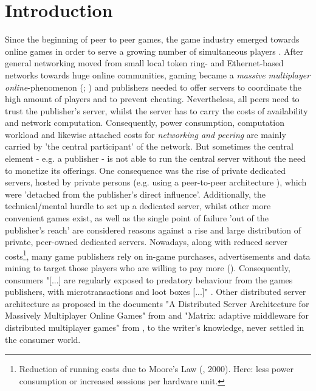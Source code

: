 
\chapter{Introduction}
\label{chap:Introduction}

Since the beginning of peer to peer games, the game industry emerged towards online games in order to serve a growing number of simultaneous players \cite[192]{Nagygyorgy.2013}.
After general networking moved from small local token ring- and Ethernet-based networks \cite[1]{Smythe.1999}
towards huge online communities, gaming became a \textit{massive multiplayer online}-phenomenon (\citet[1]{Williams.2008}; \citet[1]{Wang.2012})
and publishers needed to offer servers to coordinate the high amount of players \cite[41]{Lee.2008} and to prevent cheating.
Nevertheless, all peers need to trust the publisher's server, whilst the server has to carry the costs of availability and network computation.
Consequently, power consumption, computation workload and likewise attached costs for \textit{networking and peering} are mainly carried by 'the central participant' of the network.
But sometimes the central element - e.g. a publisher - is not able to run the central server without the need to monetize its offerings.
One consequence was the rise of private dedicated servers, hosted by private persons (e.g. using a peer-to-peer architecture \cite[41]{Lee.2008}), which were 'detached from the publisher's direct influence'.
Additionally, the technical/mental hurdle to set up a dedicated server, whilst other more convenient games exist,
as well as the single point of failure 'out of the publisher's reach'
are considered reasons against a rise and large distribution of private, peer-owned dedicated servers.
Nowadays, along with reduced server costs\footnote{\hspace{0.1cm}Reduction of running costs due to Moore's Law (\cite{Mann.2000}, 2000). Here: less power consumption or increased sessions per hardware unit.},
many game publishers rely on in-game purchases, advertisements and data mining to target those players who are willing to pay more (\cite{Davis.2012}).
Consequently, consumers "[...] are regularly exposed to predatory behaviour from the games publishers, with microtransactions and loot boxes [...]" \cite[14]{Laneve.2019}.
Other distributed server architecture as proposed in the documents "A Distributed Server Architecture for Massively Multiplayer Online Games" from \citet{Khan.2006} and
"Matrix: adaptive middleware for distributed multiplayer games" from \citet{Besancon.2019}, to the writer's knowledge, never settled in the consumer world. \\
